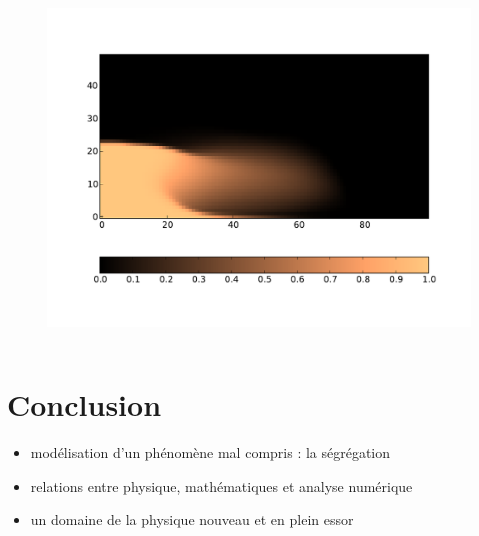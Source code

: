 \documentclass[xcolor=dvipsnames]{beamer}
\begin{document}
\begin{frame}
\begin{columns}
\begin{column}{6cm}
\begin{figure}[htp]
\centering
\includegraphics[scale=0.25]{img/3Dedge1.pdf}
\label{}
\end{figure}
\end{column}

\end{columns}

\end{frame}

\section{Conclusion}
\begin{frame}

\begin{itemize}
\item modélisation d'un phénomène mal compris : la ségrégation
\item relations entre physique, mathématiques et analyse numérique 
\item un domaine de la physique nouveau et en plein essor
\end{itemize}

\end{frame}
\end{document}
